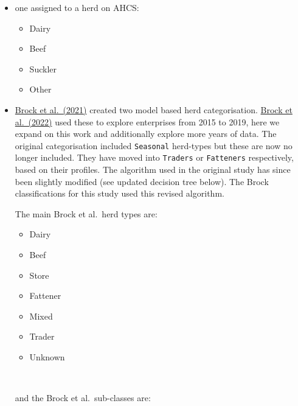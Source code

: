 \documentclass[
  letterpaper,
  DIV=11,
  numbers=noendperiod]{scrreprt}
\providecommand{\tightlist}{%
  \setlength{\itemsep}{0pt}\setlength{\parskip}{0pt}}
\begin{document}
\begin{itemize}
\item
  one assigned to a herd on AHCS:

  \begin{itemize}
  \tightlist
  \item
    Dairy
  \item
    Beef
  \item
    Suckler
  \item
    Other
  \end{itemize}
\item
  \href{https://www.nature.com/articles/s41598-021-82373-3}{Brock et
  al.~(2021)} created two model based herd categorisation.
  \href{https://irishvetjournal.biomedcentral.com/articles/10.1186/s13620-022-00212-x}{Brock
  et al.~(2022)} used these to explore enterprises from 2015 to 2019,
  here we expand on this work and additionally explore more years of
  data. The original categorisation included \texttt{Seasonal}
  herd-types but these are now no longer included. They have moved into
  \texttt{Traders} or \texttt{Fatteners} respectively, based on their
  profiles. The algorithm used in the original study has since been
  slightly modified (see updated decision tree below). The Brock
  classifications for this study used this revised algorithm.

  The main Brock et al.~herd types are:

  \begin{itemize}
  \tightlist
  \item
    Dairy
  \item
    Beef
  \item
    Store
  \item
    Fattener
  \item
    Mixed
  \item
    Trader
  \item
    Unknown
  \end{itemize}

  \(~\)

  and the Brock et al.~sub-classes are:


\end{itemize}
\end{document}
